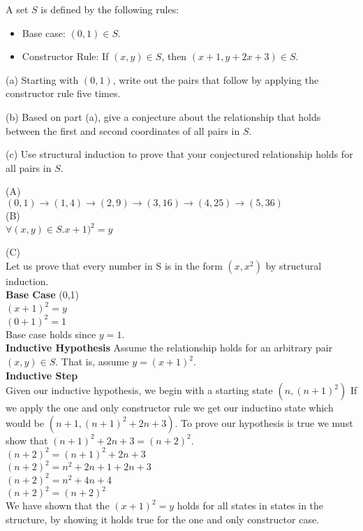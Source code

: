 \documentclass[solution,letterpaper]{cs20}
\begin{document}


    \begin{problem}

        A set $S$ is defined by the following rules:
        \begin{itemize}
            \item Base case: $(0,1) \in S$.
            \item Constructor Rule: If $(x,y) \in S$, then $(x+1,y+2x+3) \in S$.
        \end{itemize}

        (a) Starting with $(0,1)$, write out the pairs that follow by applying
        the constructor rule five times.

        (b) Based on part (a), give a conjecture about the relationship that holds between the first and second
        coordinates of all pairs in $S$.

        (c) Use structural induction to prove that your conjectured relationship holds for all pairs in $S$.

        \begin{solution}
        (A) \\
        $(0,1) \to (1,4) \to (2, 9) \to (3, 16) \to (4, 25) \to (5, 36)$ \\

        (B) \\
        $\forall (x, y) \in S. x+1)^2 = y$

        (C) \\
        Let us prove that every number in S is in the form $(x, x^2)$ by structural induction.\\
        \textbf{Base Case} (0,1)\\
        \( (x + 1)^2 = y \) \\
        \( (0 + 1)^2 = 1 \) \\
        Base case holds since \( y = 1 \).\\

        \textbf{Inductive Hypothesis}
        Assume the relationship holds for an arbitrary pair \( (x, y) \in S \). That is, assume \( y = (x + 1)^2 \).\\

        \textbf{Inductive Step} \\
        Given our inductive hypothesis, we begin with a starting state $(n, (n+1)^2)$ If we apply the one and only constructor rule we get our inductino state which would be $(n+1, (n+1)^2 + 2n + 3)$. To prove our hypothesis is true we must show that $(n+1)^2 + 2n + 3 = (n+2)^2$. \\
        $(n+2)^2 = (n+1)^2 + 2n + 3$ \\
        $(n+2)^2 = n^2 +2n + 1 + 2n + 3$ \\
        $(n+2)^2 = n^2 +4n +4 $ \\
        $(n+2)^2 = (n+2)^2$  \\
        We have shown that the $(x+1)^2 = y$ holds for all states in states in the structure, by showing it holds true for the one and only constructor case.


\end{solution}
\end{problem}
\end{document}
